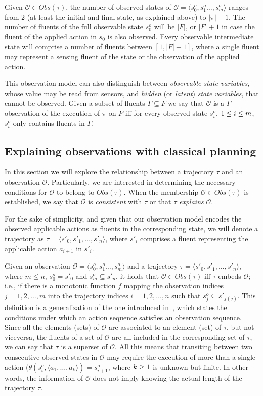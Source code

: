 \documentclass[runningheads]{llncs}
\newcommand{\tup}[1]{{\langle #1 \rangle}}
\begin{document}
Given $\mathcal{O} \in Obs(\tau)$, the number of observed states of $\mathcal{O}=\tup{s_0^o,s_1^o \ldots , s_m^o}$ ranges from 2 (at least the initial and final state, as explained above) to $|\pi|+1$. The number of fluents of the full observable state $s_0^o$ will be $|F|$, or $|F|+1$ in case the fluent of the applied action in $s_0$ is also observed. Every observable intermediate state will comprise a number of fluents between $[1,|F|+1]$, where a single fluent may represent a sensing fluent of the state or the observation of the applied action.

This observation model can also distinguish between {\em observable state variables}, whose value may be read from sensors, and {\em hidden} (or {\em latent}) {\em state variables}, that cannot be observed. Given a subset of fluents $\Gamma\subseteq F$ we say that $\mathcal{O}$ is a $\Gamma$-observation of the execution of $\pi$ on $P$ iff for every observed state $s_i^o$, ${\small 1\leq i\leq m}$, $s_i^o$ only contains fluents in $\Gamma$.


\subsection{Explaining observations with classical planning}

In this section we will explore the relationship between a trajectory $\tau$ and an observation $\mathcal{O}$. Particularly, we are interested in determining the necessary conditions for $\mathcal{O}$ to belong to $Obs(\tau)$. When the membership $\mathcal{O} \in Obs(\tau)$ is established, we say that $\mathcal{O}$ is \emph{consistent} with $\tau$ or that $\tau$ \emph{explains} $\mathcal{O}$.

For the sake of simplicity, and given that our observation model encodes the observed applicable actions as fluents in the corresponding state, we will denote a trajectory as $\tau=\tup{s'_0, s'_1, \ldots, s'_n}$, where $s'_i$ comprises a fluent representing the applicable action $a_{i+1}$ in $s'_i$.

Given an observation $\mathcal{O}=\tup{s_0^o,s_1^o \ldots , s_m^o}$ and a trajectory $\tau=\tup{s'_0, s'_1, \ldots, s'_n}$, where $m \leq n$, $s_0^o = s'_0$ and $s_m^o \subseteq s'_n$, it holds that $\mathcal{O} \in Obs(\tau)$ iff $\tau$ embeds $\mathcal{O}$; i.e., if there is a monotonic function $f$ mapping the observation indices $j=1,2, \ldots,m$ into the trajectory indices $i=1,2, \ldots,n$ such that $s_j^o \subseteq s'_{f(j)}$. This definition is a generalization of the one introduced in~\cite{ramirez2009plan}, which states the conditions under which an action sequence satisfies an observation sequence. Since all the elements (sets) of $\mathcal{O}$ are associated to an element (set) of $\tau$, but not viceversa, the fluents of a set of $\mathcal{O}$  are all included in the corresponding set of $\tau$, we can say that $\tau$ is a superset of $\mathcal{O}$. All this means that transiting between two consecutive observed states in $\mathcal{O}$ may require the execution of more than a single action ($\theta(s_i^o,\tup{a_1,\ldots,a_k})=s_{i+1}^o$, where ${\small k\geq 1}$ is unknown but finite. In other words, the information of $\mathcal{O}$ does not imply knowing the actual length of the trajectory $\tau$.
\end{document}
